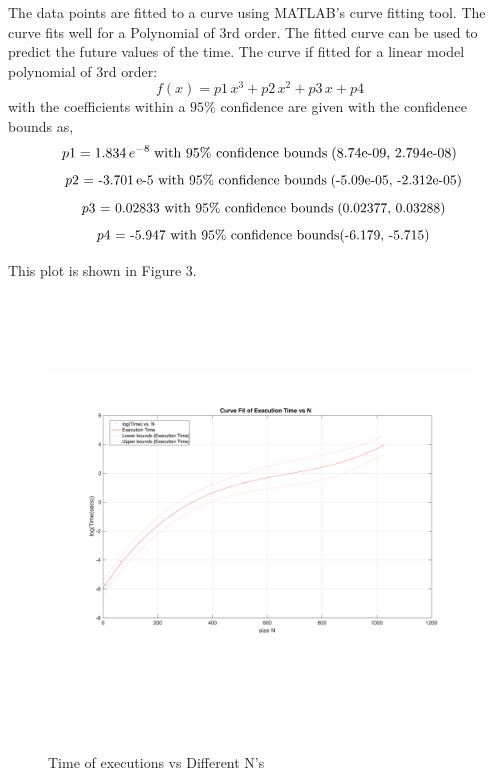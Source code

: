 \documentclass[fleqn,letterpaper,12pt]{report}
\begin{document}
The data points are fitted to a curve using MATLAB's curve fitting tool. The curve fits well for a Polynomial of 3rd order. The fitted curve can be used to predict the future values of the time.
The curve if fitted for a linear model polynomial of 3rd order:\cite{curvefitting}
\begin{equation}
\label{EQ3}
     f(x) = p1\,x^3 + p2\,x^2 + p3\,x + p4
\end{equation}
with the coefficients within a $95\%$ confidence are given with the confidence bounds as,
\begin{equation}
     p1 =   1.834\,e^{-8} 
	 \mbox{\;with 95\% confidence bounds\;(8.74e-09, 2.794e-08)}
\label{EQ4}
\end{equation}
\begin{equation}
     \mbox{\;\;$p2$ =  -3.701\,e-{5} with 95\% confidence bounds\;(-5.09e-05, -2.312e-05)} 
\label{EQ5}
\end{equation}
\begin{equation}
     \mbox{\;\;$p3$ =   0.02833 with 95\% confidence bounds\;(0.02377, 0.03288)}
\label{EQ6}
\end{equation}
\begin{equation}
     \mbox{\;\;$p4$ =   -5.947 with 95\% confidence bounds(-6.179, -5.715)}
\label{EQ7}
\end{equation}

This plot is shown in Figure 3.
\begin{figure}[ht!]
	\centering
	\includegraphics[height=120mm,width=160mm]{matrixcurve.pdf}
	\caption{Time of executions vs Different N's\label{overflow}}
\end{figure}
\end{document}
